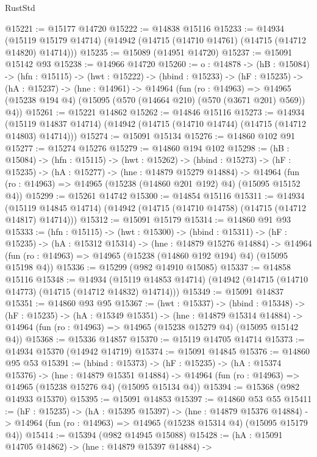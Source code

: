 \begin{lexlean}{RustStd}
\begin{coremodule}
@15221 := @15177 @14720
@15222 := @14838 @15116
@15233 := @14934
    (@15119 @15179 @14714)
    (@14942 (@14715 (@14710 @14761) (@14715 (@14712 @14820) @14714)))
@15235 := @15089 (@14951 @14720)
@15237 := @15091 @15142 @93
@15238 := @14966 @14720
@15260 := {o : @14878} ->
  (hB : @15084) ->
  (hfn : @15115) ->
  (hwt : @15222) ->
  (hbind : @15233) ->
  (hF : @15235) ->
  (hA : @15237) ->
  (hne : @14961) ->
  @14964
    (fun (ro : @14963) =>
    @14965 (@15238 @194 @4) (@15095 (@570 (@14664 @210) (@570 (@3671 @201) @569)) @4))
@15261 := @15221 @14862
@15262 := @14846 @15116
@15273 := @14934
    (@15119 @14837 @14714)
    (@14942 (@14715 (@14710 @14744) (@14715 (@14712 @14803) @14714)))
@15274 := @15091 @15134
@15276 := @14860 @102 @91
@15277 := @15274 @15276
@15279 := @14860 @194 @102
@15298 := (hB : @15084) ->
  (hfn : @15115) ->
  (hwt : @15262) ->
  (hbind : @15273) ->
  (hF : @15235) ->
  (hA : @15277) ->
  (hne : @14879 @15279 @14884) ->
  @14964 (fun (ro : @14963) => @14965 (@15238 (@14860 @201 @192) @4) (@15095 @15152 @4))
@15299 := @15261 @14742
@15300 := @14854 @15116
@15311 := @14934
    (@15119 @14845 @14714)
    (@14942 (@14715 (@14710 @14758) (@14715 (@14712 @14817) @14714)))
@15312 := @15091 @15179
@15314 := @14860 @91 @93
@15333 := (hfn : @15115) ->
  (hwt : @15300) ->
  (hbind : @15311) ->
  (hF : @15235) ->
  (hA : @15312 @15314) ->
  (hne : @14879 @15276 @14884) ->
  @14964 (fun (ro : @14963) => @14965 (@15238 (@14860 @192 @194) @4) (@15095 @15198 @4))
@15336 := @15299 (@982 @14910 @15085)
@15337 := @14858 @15116
@15348 := @14934
    (@15119 @14853 @14714)
    (@14942 (@14715 (@14710 @14773) (@14715 (@14712 @14832) @14714)))
@15349 := @15091 @14837
@15351 := @14860 @93 @95
@15367 := (hwt : @15337) ->
  (hbind : @15348) ->
  (hF : @15235) ->
  (hA : @15349 @15351) ->
  (hne : @14879 @15314 @14884) ->
  @14964 (fun (ro : @14963) => @14965 (@15238 @15279 @4) (@15095 @15142 @4))
@15368 := @15336 @14857
@15370 := @15119 @14705 @14714
@15373 := @14934 @15370 (@14942 @14719)
@15374 := @15091 @14845
@15376 := @14860 @95 @53
@15391 := (hbind : @15373) ->
  (hF : @15235) ->
  (hA : @15374 @15376) ->
  (hne : @14879 @15351 @14884) ->
  @14964 (fun (ro : @14963) => @14965 (@15238 @15276 @4) (@15095 @15134 @4))
@15394 := @15368 (@982 @14933 @15370)
@15395 := @15091 @14853
@15397 := @14860 @53 @55
@15411 := (hF : @15235) ->
  (hA : @15395 @15397) ->
  (hne : @14879 @15376 @14884) ->
  @14964 (fun (ro : @14963) => @14965 (@15238 @15314 @4) (@15095 @15179 @4))
@15414 := @15394 (@982 @14945 @15088)
@15428 := (hA : @15091 @14705 @14862) ->
  (hne : @14879 @15397 @14884) ->

\end{coremodule}
\end{lexlean}
